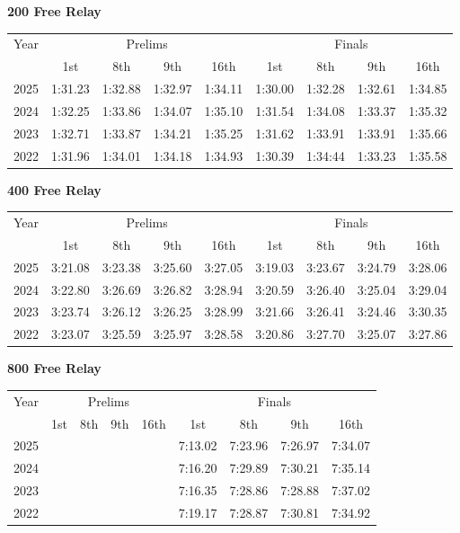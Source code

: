 \textbf{200 Free Relay}

\begin{flushleft}
\begin{tabular}{|c|c|c|c|c|c|c|c|c|}
\hline
Year & \multicolumn{4}{c|}{Prelims} & \multicolumn{4}{c|}{Finals} \\
\cline{2-9}
& 1st & 8th & 9th & 16th & 1st & 8th & 9th & 16th \\
\hline
2025 & 1:31.23 & 1:32.88 & 1:32.97 & 1:34.11 & 1:30.00 & 1:32.28 & 1:32.61 & 1:34.85 \\
2024 & 1:32.25 & 1:33.86 & 1:34.07 & 1:35.10 & 1:31.54 & 1:34.08 & 1:33.37 & 1:35.32 \\
2023 & 1:32.71 & 1:33.87 & 1:34.21 & 1:35.25 & 1:31.62 & 1:33.91 & 1:33.91 & 1:35.66 \\
2022 & 1:31.96 & 1:34.01 & 1:34.18 & 1:34.93 & 1:30.39 & 1:34:44 & 1:33.23 & 1:35.58 \\
\hline
\end{tabular}
\end{flushleft}

\clearpage
\textbf{400 Free Relay}

\begin{flushleft}
\begin{tabular}{|c|c|c|c|c|c|c|c|c|}
\hline
Year & \multicolumn{4}{c|}{Prelims} & \multicolumn{4}{c|}{Finals} \\
\cline{2-9}
& 1st & 8th & 9th & 16th & 1st & 8th & 9th & 16th \\
\hline
2025 & 3:21.08 & 3:23.38 & 3:25.60 & 3:27.05 & 3:19.03 & 3:23.67 & 3:24.79 & 3:28.06 \\
2024 & 3:22.80 & 3:26.69 & 3:26.82 & 3:28.94 & 3:20.59 & 3:26.40 & 3:25.04 & 3:29.04 \\
2023 & 3:23.74 & 3:26.12 & 3:26.25 & 3:28.99 & 3:21.66 & 3:26.41 & 3:24.46 & 3:30.35 \\
2022 & 3:23.07 & 3:25.59 & 3:25.97 & 3:28.58 & 3:20.86 & 3:27.70 & 3:25.07 & 3:27.86 \\
\hline
\end{tabular}
\end{flushleft}

\textbf{800 Free Relay}

\begin{flushleft}
\begin{tabular}{|c|c|c|c|c|c|c|c|c|}
\hline
Year & \multicolumn{4}{c|}{Prelims} & \multicolumn{4}{c|}{Finals} \\
\cline{2-9}
& 1st & 8th & 9th & 16th & 1st & 8th & 9th & 16th \\
\hline
2025 &  &  &  &  & 7:13.02 & 7:23.96 & 7:26.97 & 7:34.07 \\
2024 &  &  &  &  & 7:16.20 & 7:29.89 & 7:30.21 & 7:35.14 \\
2023 &  &  &  &  & 7:16.35 & 7:28.86 & 7:28.88 & 7:37.02 \\
2022 &  &  &  &  & 7:19.17 & 7:28.87 & 7:30.81 & 7:34.92 \\
\hline
\end{tabular}
\end{flushleft}
